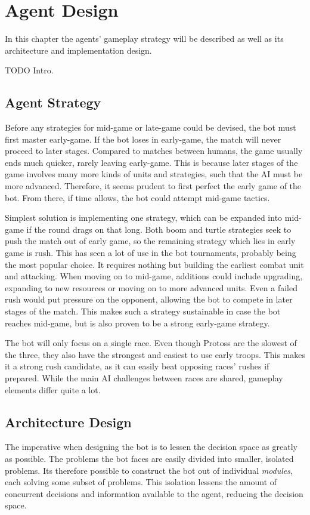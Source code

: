 \chapter{Agent Design}
In this chapter the agents' gameplay strategy will be described as well as its architecture and implementation design.

TODO Intro.

\section{Agent Strategy}
Before any strategies for mid-game or late-game could be devised, the bot must first master early-game. If the bot loses in early-game, the match will never proceed to later stages. Compared to matches between humans, the game usually ends much quicker, rarely leaving early-game. This is because later stages of the game involves many more kinds of units and strategies, such that the AI must be more advanced. Therefore, it seems prudent to first perfect the early game of the bot. From there, if time allows, the bot could attempt mid-game tactics.

Simplest solution is implementing one strategy, which can be expanded into mid-game if the round drags on that long. Both boom and turtle strategies seek to push the match out of early game, so the remaining strategy which lies in early game is rush. This has seen a lot of use in the bot tournaments, probably being the most popular choice. It requires nothing but building the earliest combat unit and attacking. When moving on to mid-game, additions could include upgrading, expanding to new resources or moving on to more advanced units. Even a failed rush would put pressure on the opponent, allowing the bot to compete in later stages of the match. This makes such a strategy sustainable in case the bot reaches mid-game, but is also proven to be a strong early-game strategy.

The bot will only focus on a single race. Even though Protoss are the slowest of the three, they also have the strongest and easiest to use early troops. This makes it a strong rush candidate, as it can easily beat opposing races' rushes if prepared. While the main AI challenges between races are shared, gameplay elements differ quite a lot.

\section{Architecture Design}
The imperative when designing the bot is to lessen the decision space as greatly as possible. The problems the bot faces are easily divided into smaller, isolated problems. Its therefore possible to construct the bot out of individual \emph{modules}, each solving some subset of problems. This isolation lessens the amount of concurrent decisions and information available to the agent, reducing the decision space.

